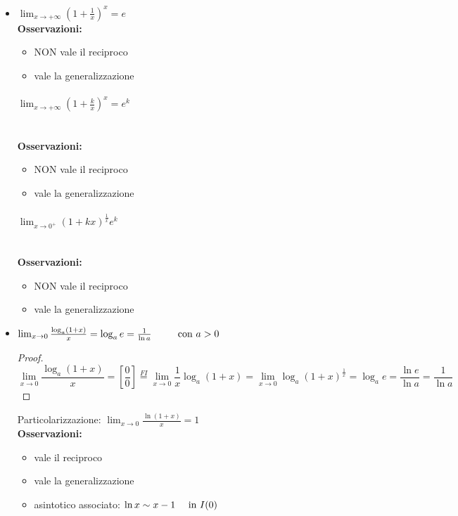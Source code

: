 \documentclass{book}     %
\begin{document}
\begin{itemize}
\item {$\lim_{x\to +\infty}\left(1+\frac{1}{x}\right)^{x} = e$}~\vspace{10pt}\\
\textbf{Osservazioni:}
\begin{itemize}
    \item NON vale il reciproco
    \item vale la generalizzazione
\end{itemize}

\paragraph{$\lim_{x\to +\infty}\left(1+\frac{k}{x}\right)^{x} = e^k$}~\vspace{10pt}\\
\textbf{Osservazioni:}
\begin{itemize}
    \item NON vale il reciproco
    \item vale la generalizzazione
\end{itemize}

\paragraph{$\lim_{x\to 0^+}\left(1+kx\right)^{\frac{1}{x}}  e^k$}~\vspace{10pt}\\
\textbf{Osservazioni:}
\begin{itemize}
    \item NON vale il reciproco
    \item vale la generalizzazione
\end{itemize}

\item {$\lim_{x\to 0}\frac{\log_a(1+x)}{x}=\log_ae=\frac{1}{\ln a}~~~~~~~~\textnormal{con }a>0$}
\begin{proof}
\[\lim_{x\to 0}\frac{\log_a(1+x)}{x}=\left[\frac{0}{0}\right]\overset{FI}{=}\lim_{x\to 0}\frac{1}{x}\log_a(1+x)=\lim_{x\to 0}\log_a(1+x)^\frac{1}{x}=\log_ae=\frac{\ln e}{\ln a}=\frac{1}{\ln a}\]
\end{proof}
Particolarizzazione: $\lim_{x\to0}\frac{\ln(1+x)}{x}=1$~\vspace{10pt}\\
\textbf{Osservazioni:}
\begin{itemize}
    \item vale il reciproco
    \item vale la generalizzazione
    \item asintotico associato: $\ln x \sim x - 1 ~~~~\textnormal{in } I(0)$
\end{itemize}


\end{itemize}
\end{document}
